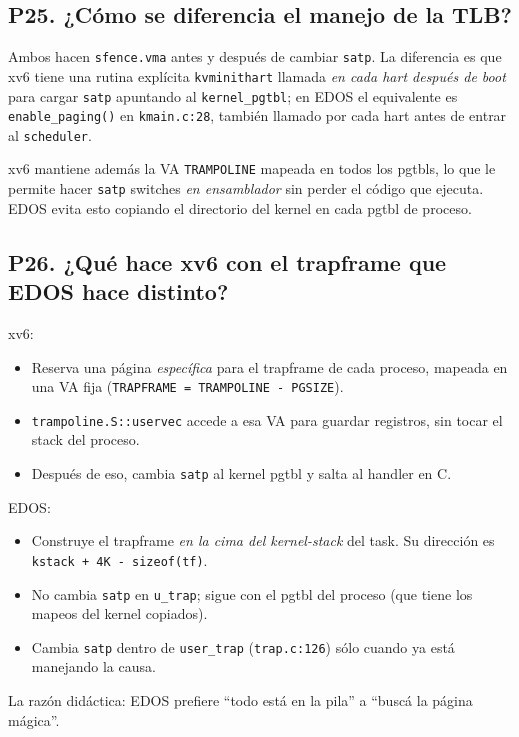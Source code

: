 \documentclass[11pt,a4paper]{article}
\begin{document}
\subsection*{P25. ¿Cómo se diferencia el manejo de la TLB?}

\begin{respuesta}
Ambos hacen \texttt{sfence.vma} antes y después de cambiar
\texttt{satp}. La diferencia es que xv6 tiene una rutina explícita
\texttt{kvminithart} llamada \emph{en cada hart después de boot}
para cargar \texttt{satp} apuntando al \texttt{kernel\_pgtbl}; en
EDOS el equivalente es \texttt{enable\_paging()} en
\texttt{kmain.c:28}, también llamado por cada hart antes de entrar
al \texttt{scheduler}.

xv6 mantiene además la VA \texttt{TRAMPOLINE} mapeada en todos los
pgtbls, lo que le permite hacer \texttt{satp} switches \emph{en
ensamblador} sin perder el código que ejecuta. EDOS evita esto
copiando el directorio del kernel en cada pgtbl de proceso.
\end{respuesta}

\subsection*{P26. ¿Qué hace xv6 con el trapframe que EDOS hace distinto?}

\begin{respuesta}
xv6:

\begin{itemize}[nosep,leftmargin=*]
    \item Reserva una página \emph{específica} para el trapframe de
        cada proceso, mapeada en una VA fija (\texttt{TRAPFRAME =
        TRAMPOLINE - PGSIZE}).
    \item \texttt{trampoline.S::uservec} accede a esa VA para
        guardar registros, sin tocar el stack del proceso.
    \item Después de eso, cambia \texttt{satp} al kernel pgtbl y
        salta al handler en C.
\end{itemize}

EDOS:

\begin{itemize}[nosep,leftmargin=*]
    \item Construye el trapframe \emph{en la cima del kernel-stack}
        del task. Su dirección es \texttt{kstack + 4K -
        sizeof(tf)}.
    \item No cambia \texttt{satp} en \texttt{u\_trap}; sigue con el
        pgtbl del proceso (que tiene los mapeos del kernel
        copiados).
    \item Cambia \texttt{satp} dentro de \texttt{user\_trap}
        (\texttt{trap.c:126}) sólo cuando ya está manejando la
        causa.
\end{itemize}

La razón didáctica: EDOS prefiere ``todo está en la pila'' a
``buscá la página mágica''.
\end{respuesta}
\end{document}
